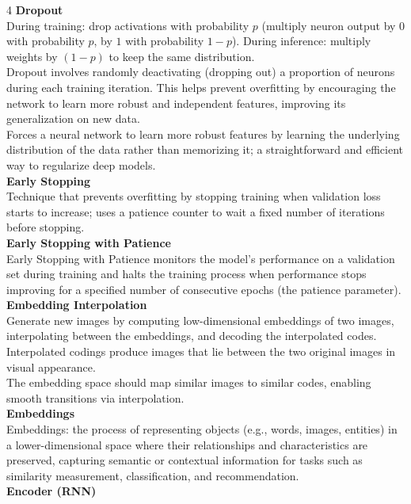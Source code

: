 \documentclass[8pt]{extarticle}
\begin{document}
\begin{multicols}{4}
\vspace{2pt}\textbf{Dropout}\\
During training: drop activations with probability $p$ (multiply neuron output by $0$ with probability $p$, by $1$ with probability $1-p$). During inference: multiply weights by $(1-p)$ to keep the same distribution.\\
Dropout involves randomly deactivating (dropping out) a proportion of neurons during each training iteration. This helps prevent overfitting by encouraging the network to learn more robust and independent features, improving its generalization on new data.\\
Forces a neural network to learn more robust features by learning the underlying distribution of the data rather than memorizing it; a straightforward and efficient way to regularize deep models.\\
\vspace{2pt}\textbf{Early Stopping}\\
Technique that prevents overfitting by stopping training when validation loss starts to increase; uses a patience counter to wait a fixed number of iterations before stopping.\\
\vspace{2pt}\textbf{Early Stopping with Patience}\\
Early Stopping with Patience monitors the model's performance on a validation set during training and halts the training process when performance stops improving for a specified number of consecutive epochs (the patience parameter).\\
\vspace{2pt}\textbf{Embedding Interpolation}\\
Generate new images by computing low-dimensional embeddings of two images, interpolating between the embeddings, and decoding the interpolated codes.\\
Interpolated codings produce images that lie between the two original images in visual appearance.\\
The embedding space should map similar images to similar codes, enabling smooth transitions via interpolation.\\
\vspace{2pt}\textbf{Embeddings}\\
Embeddings: the process of representing objects (e.g., words, images, entities) in a lower-dimensional space where their relationships and characteristics are preserved, capturing semantic or contextual information for tasks such as similarity measurement, classification, and recommendation.\\
\vspace{2pt}\textbf{Encoder (RNN)}\\


\end{multicols}
\end{document}
